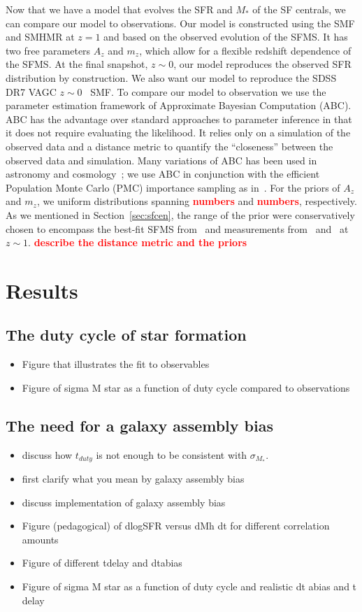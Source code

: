 \documentclass[12pt, letterpaper, preprint]{aastex}
\newcommand{\todo}[1]{{\bf \textcolor{red}{#1}}}
\newcommand{\bitem}{\begin{itemize}}
\newcommand{\eitem}{\end{itemize}}
\begin{document}
Now that we have a model that evolves the SFR and $M_*$ of the SF centrals, 
we can compare our model to observations. Our model is constructed using the SMF 
and SMHMR at $z = 1$ and based on the observed evolution of the SFMS. 
It has two free parameters $A_z$ and $m_z$, which allow for a flexible redshift 
dependence of the SFMS. At the final snapshot, $z \sim 0$, our model reproduces 
the observed SFR distribution by construction. We also want our model to reproduce 
the SDSS DR7 VAGC $z \sim 0$~\cite{li2009} SMF. To compare our model to observation
we use the parameter estimation framework of Approximate Bayesian Computation (ABC). 
ABC has the advantage over standard approaches to parameter inference in that it does not 
require evaluating the likelihood. It relies only on a simulation of the observed 
data and a distance metric to quantify the ``closeness'' between the observed data
and simulation. Many variations of ABC has been used in astronomy and 
cosmology~\citep[\emph{e.g.}][]{cameron2012,weyant2013,ishida2015,alsing2018}; 
we use ABC in conjunction with the efficient Population Monte Carlo (PMC)
importance sampling as in~\citep{hahn2016, hahn2017}. For the priors of $A_z$ and $m_z$, 
we uniform distributions spanning \todo{numbers} and \todo{numbers}, respectively. As we 
mentioned in Section~\ref{sec:sfcen}, the range of the prior were conservatively chosen
to encompass the best-fit SFMS from~\cite{speagle2014} and measurements 
from~\cite{moustakas2013} and~\cite{lee2015} at $z \sim 1$. 
\todo{describe the distance metric and the priors} 

\section{Results}
\subsection{The duty cycle of star formation}
\bitem
\item Figure that illustrates the fit to observables 
\item Figure of sigma M star as a function of duty cycle compared to observations 
\eitem 

\subsection{The need for a galaxy assembly bias}
\bitem
\item discuss how $t_{duty}$ is not enough to be consistent with $\sigma_{M_*}$. 
\item first clarify what you mean by galaxy assembly bias 
\item discuss implementation of galaxy assembly bias
\item Figure (pedagogical) of dlogSFR versus dMh dt for different correlation amounts 
\item Figure of different tdelay and dtabias 
\item Figure of sigma M star as a function of duty cycle and realistic dt abias and t delay 
\eitem
\end{document}
